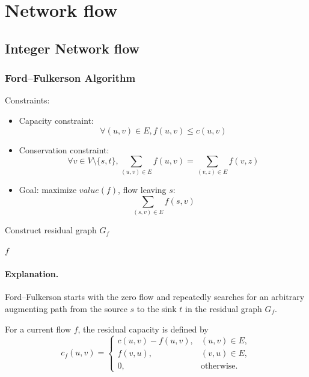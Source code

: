 \documentclass[10pt]{article}
\theoremstyle{definition}
\begin{document}
\section{Network flow}
\subsection{Integer Network flow}
\subsubsection{Ford--Fulkerson Algorithm}
Constraints:
\begin{itemize}
  \item Capacity constraint: 
  \[\forall (u, v) \in E, f(u, v) \leq c(u, v)\]
  \item Conservation constraint:
  \[\forall v \in V \setminus \{s, t\}, \sum_{(u, v) \in E} f(u, v) = \sum_{(v, z) \in E} f(v, z)\]
  \item Goal: maximize $value(f)$, flow leaving $s$:
  \[\sum_{(s, v) \in E} f(s, v)\]
\end{itemize}

\begin{algorithm}[H]


  Construct residual graph $G_f$\;


  \Return $f$\;
\end{algorithm}
\paragraph{Explanation.}
Ford--Fulkerson starts with the zero flow and repeatedly searches for an
arbitrary augmenting path from the source $s$ to the sink $t$ in the
residual graph $G_f$.

For a current flow $f$, the residual capacity is defined by
\[
c_f(u,v)=
\begin{cases}
c(u,v)-f(u,v), & (u,v)\in E,\\[2mm]
f(v,u), & (v,u)\in E,\\[2mm]
0, & \text{otherwise}.
\end{cases}
\]
\end{document}
